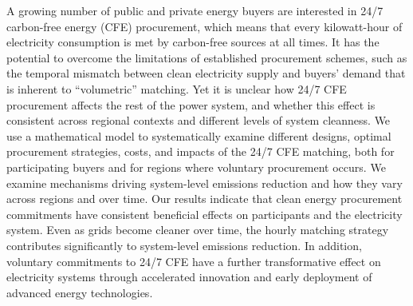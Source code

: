 A growing number of public and private energy buyers are interested in 24/7 carbon-free energy (CFE) procurement, which means that every kilowatt-hour of electricity consumption is met by carbon-free sources at all times.
It has the potential to overcome the limitations of established procurement schemes, such as the temporal mismatch between clean electricity supply and buyers' demand that is inherent to \enquote{volumetric} matching. 
Yet it is unclear how 24/7 CFE procurement affects the rest of the power system, and whether this effect is consistent across regional contexts and different levels of system cleanness.
We use a mathematical model to systematically examine different designs, optimal procurement strategies, costs, and impacts of the 24/7 CFE matching, both for participating buyers and for regions where voluntary procurement occurs.
We examine mechanisms driving system-level emissions reduction and how they vary across regions and over time.
Our results indicate that clean energy procurement commitments have consistent beneficial effects on participants and the electricity system.
Even as grids become cleaner over time, the hourly matching strategy contributes significantly to system-level emissions reduction.
In addition, voluntary commitments to 24/7 CFE have a further transformative effect on electricity systems through accelerated innovation and early deployment of advanced energy technologies.


